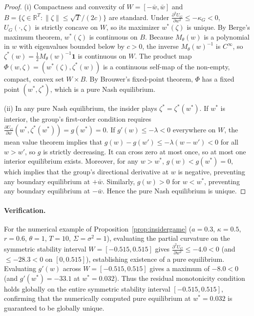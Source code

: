 \documentclass[12pt]{article}
\theoremstyle{definition}
\theoremstyle{remark}
\begin{document}
\begin{proof}
(i) Compactness and convexity of $W=[-\bar w,\bar w]$ and $B=\{\zeta\in\mathbb R^T:\|\zeta\|\le\sqrt T/(2c)\}$ are standard. Under $\frac{\partial^2 U_G}{\partial w^2}\le-\kappa_G<0$, $U_G(\cdot,\zeta)$ is strictly concave on $W$, so its maximizer $w^*(\zeta)$ is unique. By Berge's maximum theorem, $w^*(\zeta)$ is continuous on $B$. Because $M_\theta(w)$ is a polynomial in $w$ with eigenvalues bounded below by $c>0$, the inverse $M_\theta(w)^{-1}$ is $C^\infty$, so $\zeta^*(w)=\frac12 M_\theta(w)^{-1}\mathbf 1$ is continuous on $W$. The product map $\Phi(w,\zeta)=(w^*(\zeta),\zeta^*(w))$ is a continuous self-map of the non-empty, compact, convex set $W\times B$. By Brouwer's fixed-point theorem, $\Phi$ has a fixed point $(w^*,\zeta^*)$, which is a pure Nash equilibrium.

(ii) In any pure Nash equilibrium, the insider plays $\zeta^*=\zeta^*(w^*)$. If $w^*$ is interior, the group's first-order condition requires $\frac{\partial U_G}{\partial w}(w^*,\zeta^*(w^*))=g(w^*)=0$. If $g'(w)\le-\lambda<0$ everywhere on $W$, the mean value theorem implies that $g(w)-g(w')\le-\lambda(w-w')<0$ for all $w>w'$, so $g$ is strictly decreasing. It can cross zero at most once, so at most one interior equilibrium exists. Moreover, for any $w>w^*$, $g(w)<g(w^*)=0$, which implies that the group's directional derivative at $w$ is negative, preventing any boundary equilibrium at $+\bar w$. Similarly, $g(w)>0$ for $w<w^*$, preventing any boundary equilibrium at $-\bar w$. Hence the pure Nash equilibrium is unique.
\end{proof}

\paragraph{Verification.} For the numerical example of Proposition~\ref{prop:insidergame} ($a=0.3$, $\kappa=0.5$, $r=0.6$, $\theta=1$, $T=10$, $\Sigma=\sigma^2=1$), evaluating the partial curvature on the symmetric stability interval $W=[-0.515,0.515]$ gives $\frac{\partial^2 U_G}{\partial w^2}\le-4.0<0$ (and $\le-28.3<0$ on $[0,0.515]$), establishing existence of a pure equilibrium. Evaluating $g'(w)$ across $W=[-0.515,0.515]$ gives a maximum of $-8.0<0$ (and $g'(w^*)=-33.1$ at $w^*=0.032$). Thus the residual monotonicity condition holds globally on the entire symmetric stability interval $[-0.515,0.515]$, confirming that the numerically computed pure equilibrium at $w^*=0.032$ is guaranteed to be globally unique.
\end{document}
